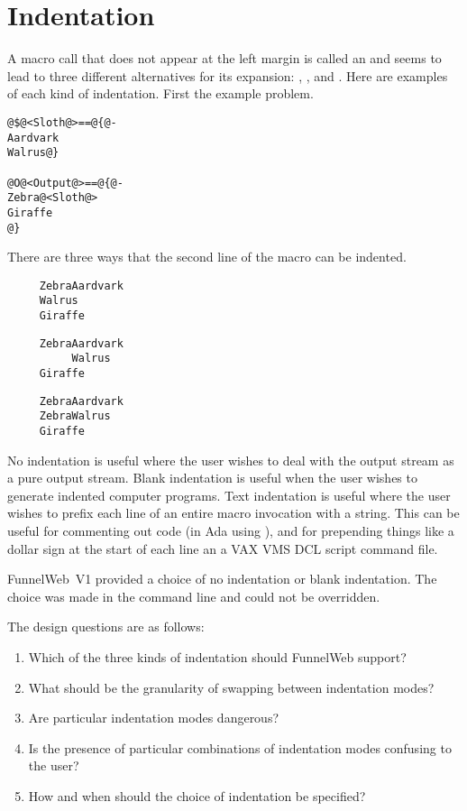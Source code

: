 \section{Indentation}
%

A macro call that does not appear at the left margin is called an
 and seems to lead to three different
alternatives for its expansion: , , and . Here are examples of each kind
of indentation. First the example problem.

\begin{verbatim}
@$@<Sloth@>==@{@-
Aardvark
Walrus@}

@O@<Output@>==@{@-
Zebra@<Sloth@>
Giraffe
@}
\end{verbatim}

There are three ways that the second line of the  macro
can be indented.

\begin{verbatim}
     ZebraAardvark
     Walrus
     Giraffe
\end{verbatim}

\begin{verbatim}
     ZebraAardvark
          Walrus
     Giraffe
\end{verbatim}

\begin{verbatim}
     ZebraAardvark
     ZebraWalrus
     Giraffe
\end{verbatim}

No indentation is useful where the user wishes to deal with the output
stream as a pure output stream. Blank indentation is useful when the user
wishes to generate indented computer programs.
Text indentation is useful where the user wishes to prefix each line of an
entire macro invocation with a string. This can be useful for
commenting out code (\eg{}in Ada using \p{--}), and for prepending things
like a dollar sign at the start of each line an a VAX VMS DCL script
command file.

FunnelWeb~V1 provided a choice of no indentation or blank indentation.
The choice was made in the command line and could not be overridden.

The design questions are as follows:

\begin{enumerate}
\item Which of the three kinds of indentation should FunnelWeb support?
\item What should be the granularity of swapping between indentation modes?
\item Are particular indentation modes dangerous?
\item Is the presence of particular combinations of indentation modes
      confusing to the user?
\item How and when should the choice of indentation be specified?
\end{enumerate}

